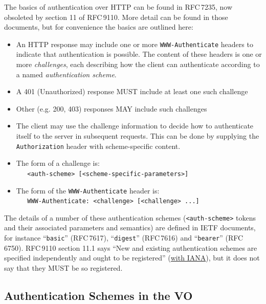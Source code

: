 \documentclass[11pt,a4paper]{ivoa}
\newcommand{\rfc}[1]{RFC\,#1}
\newcommand{\header}[1]{{\tt #1}}
\begin{document}
The basics of authentication over HTTP can be found in \rfc{7235},
now obsoleted by section 11 of \rfc{9110}.
More detail can be found in those documents, but for convenience
the basics are outlined here:
\begin{itemize}
  \item An HTTP response may include one or more 
        \header{WWW-Authenticate} headers
        to indicate that authentication is possible.
        The content of these headers is one or more {\em challenges},
        each describing how the client can authenticate according
        to a named {\em authentication scheme}.
  \item A 401 (Unauthorized) response MUST include at least one such challenge
  \item Other (e.g. 200, 403) responses MAY include such challenges
  \item The client may use the challenge information to decide how
        to authenticate itself to the server in subsequent requests.
        This can be done by supplying the \header{Authorization} header
        with scheme-specific content.
  \item The form of a challenge is:\\
        \verb|   <auth-scheme> [<scheme-specific-parameters>]|
  \item The form of the \header{WWW-Authenticate} header is:\\
        \verb|   WWW-Authenticate: <challenge> [<challenge> ...]|
\end{itemize}


The details of a number of these authentication schemes
(\verb|<auth-scheme>| tokens and their associated parameters and semantics)
are defined in IETF documents, for instance
``{\tt basic}'' (\rfc{7617}),
``{\tt digest}'' (\rfc{7616})
and
``{\tt bearer}'' (\rfc{6750}).
\rfc{9110} section 11.1 says
``New and existing authentication schemes are
  specified independently and ought to be registered''
  (\href{https://www.iana.org/assignments/http-authschemes}{with IANA}),
but it does not say that they MUST be so registered.



\subsection{Authentication Schemes in the VO}
\end{document}
